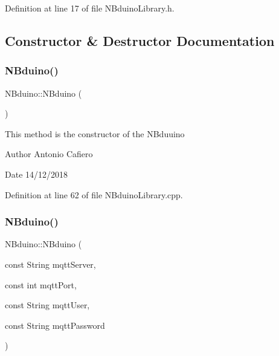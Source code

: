 Definition at line 17 of file N\+Bduino\+Library.\+h.



\subsection{Constructor \& Destructor Documentation}
\mbox{\label{class_n_bduino_acd7c1c69bffccefc807ff89394732a7d}} 
\subsubsection{\texorpdfstring{N\+Bduino()}{NBduino()}\hspace{0.1cm}{\footnotesize\ttfamily [1/3]}}
{\footnotesize\ttfamily N\+Bduino\+::\+N\+Bduino (\begin{DoxyParamCaption}{ }\end{DoxyParamCaption})}

This method is the constructor of the N\+Bduuino \begin{DoxyAuthor}{Author}
Antonio Cafiero 
\end{DoxyAuthor}
\begin{DoxyDate}{Date}
14/12/2018 
\end{DoxyDate}


Definition at line 62 of file N\+Bduino\+Library.\+cpp.

\mbox{\label{class_n_bduino_af520a0691a464694c224aba7bd1b81f6}} 
\subsubsection{\texorpdfstring{N\+Bduino()}{NBduino()}\hspace{0.1cm}{\footnotesize\ttfamily [2/3]}}
{\footnotesize\ttfamily N\+Bduino\+::\+N\+Bduino (\begin{DoxyParamCaption}\item[{const String}]{mqtt\+Server,  }\item[{const int}]{mqtt\+Port,  }\item[{const String}]{mqtt\+User,  }\item[{const String}]{mqtt\+Password }\end{DoxyParamCaption})}

